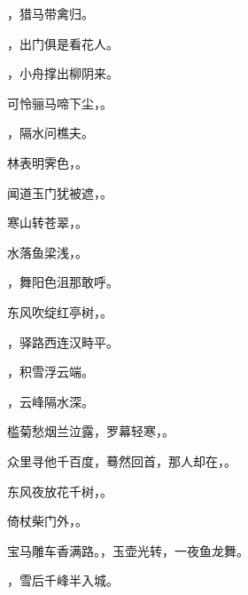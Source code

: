 \documentclass[12pt, a4paper, addpoints]{exam}
\begin{document}
\begin{questions}
\question[1] \uline{\qquad\qquad\qquad}，猎马带禽归。

\question[1] \uline{\qquad\qquad\qquad}，出门俱是看花人。

\question[1] \uline{\qquad\qquad\qquad}，小舟撑出柳阴来。

\question[1] 可怜骊马啼下尘，\uline{\qquad\qquad\qquad}。

\question[1] \uline{\qquad\qquad\qquad}，隔水问樵夫。

\question[1] 林表明霁色，\uline{\qquad\qquad\qquad}。

\question[1] 闻道玉门犹被遮，\uline{\qquad\qquad\qquad}。

\question[1] 寒山转苍翠，\uline{\qquad\qquad\qquad}。

\question[1] 水落鱼梁浅，\uline{\qquad\qquad\qquad}。

\question[1] \uline{\qquad\qquad\qquad}，舞阳色沮那敢呼。

\question[1] 东风吹绽红亭树，\uline{\qquad\qquad\qquad}。

\question[1] \uline{\qquad\qquad\qquad}，驿路西连汉畤平。

\question[1] \uline{\qquad\qquad\qquad}，积雪浮云端。

\question[1] \uline{\qquad\qquad\qquad}，云峰隔水深。

\question[1] 槛菊愁烟兰泣露，罗幕轻寒，\uline{\qquad\qquad\qquad}。

\question[1] 众里寻他千百度，蓦然回首，那人却在，\uline{\qquad\qquad\qquad}。

\question[1] 东风夜放花千树，\uline{\qquad\qquad\qquad}。

\question[1] 倚杖柴门外，\uline{\qquad\qquad\qquad}。

\question[1] 宝马雕车香满路。\uline{\qquad\qquad\qquad}，玉壶光转，一夜鱼龙舞。

\question[1] \uline{\qquad\qquad\qquad}，雪后千峰半入城。

\end{questions}

\hspace{5cm}
\end{document}
